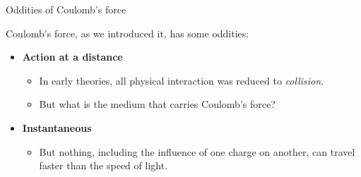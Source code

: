 %
%
%

\begin{frame}{Oddities of Coulomb's force}

Coulomb's force, as we introduced it, has some oddities:\\
\vspace{0.5cm}
\begin{itemize}
  \item {\bf Action at a distance}
    \begin{itemize}
       \item In early theories, all physical interaction was reduced to {\em collision}.
       \item But what is the medium that carries Coulomb's force?
    \end{itemize}
  \vspace{0.3cm}
  \item {\bf Instantaneous}
    \begin{itemize}
       \item But nothing, including the influence of one charge on another, can travel
             faster than the speed of light.
    \end{itemize}
\end{itemize}

\end{frame}


